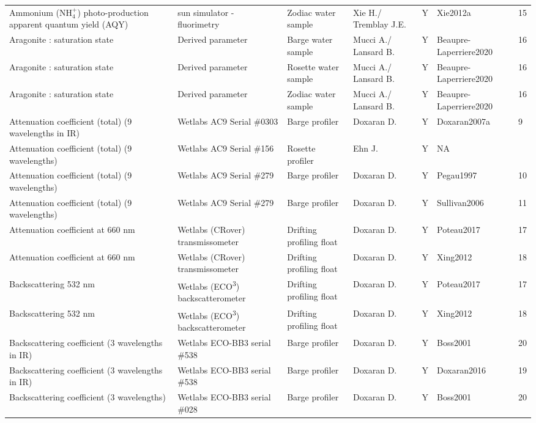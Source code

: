 \begin{ThreePartTable}
\begin{longtable}[t]{lllllll}
\addlinespace
Ammonium (NH$^+_4$) photo-production apparent quantum yield (AQY) & sun simulator - fluorimetry & Zodiac water sample & Xie H./ Tremblay J.E. & Y & Xie2012a & 15\\
Aragonite : saturation state & Derived parameter & Barge water sample & Mucci A./ Lansard B. & Y & Beaupre-Laperriere2020 & 16\\
Aragonite : saturation state & Derived parameter & Rosette water sample & Mucci A./ Lansard B. & Y & Beaupre-Laperriere2020 & 16\\
Aragonite : saturation state & Derived parameter & Zodiac water sample & Mucci A./ Lansard B. & Y & Beaupre-Laperriere2020 & 16\\
Attenuation coefficient (total) (9 wavelengths in IR) & Wetlabs AC9 Serial \#0303 & Barge profiler & Doxaran D. & Y & Doxaran2007a & 9\\
\addlinespace
Attenuation coefficient (total) (9 wavelengths) & Wetlabs AC9 Serial \#156 & Rosette profiler & Ehn J. & Y & NA & \\
Attenuation coefficient (total) (9 wavelengths) & Wetlabs AC9 Serial \#279 & Barge profiler & Doxaran D. & Y & Pegau1997 & 10\\
Attenuation coefficient (total) (9 wavelengths) & Wetlabs AC9 Serial \#279 & Barge profiler & Doxaran D. & Y & Sullivan2006 & 11\\
Attenuation coefficient at 660 nm & Wetlabs (CRover) transmissometer & Drifting profiling float & Doxaran D. & Y & Poteau2017 & 17\\
Attenuation coefficient at 660 nm & Wetlabs (CRover) transmissometer & Drifting profiling float & Doxaran D. & Y & Xing2012 & 18\\
\addlinespace
Backscattering 532 nm & Wetlabs (ECO\textsuperscript{3}) backscatterometer & Drifting profiling float & Doxaran D. & Y & Poteau2017 & 17\\
Backscattering 532 nm & Wetlabs (ECO\textsuperscript{3}) backscatterometer & Drifting profiling float & Doxaran D. & Y & Xing2012 & 18\\
Backscattering coefficient (3 wavelengths in IR) & Wetlabs ECO-BB3 serial \#538 & Barge profiler & Doxaran D. & Y & Boss2001 & 20\\
Backscattering coefficient (3 wavelengths in IR) & Wetlabs ECO-BB3 serial \#538 & Barge profiler & Doxaran D. & Y & Doxaran2016 & 19\\
Backscattering coefficient (3 wavelengths) & Wetlabs ECO-BB3 serial \#028 & Barge profiler & Doxaran D. & Y & Boss2001 & 20\\

\end{longtable}
\end{ThreePartTable}

